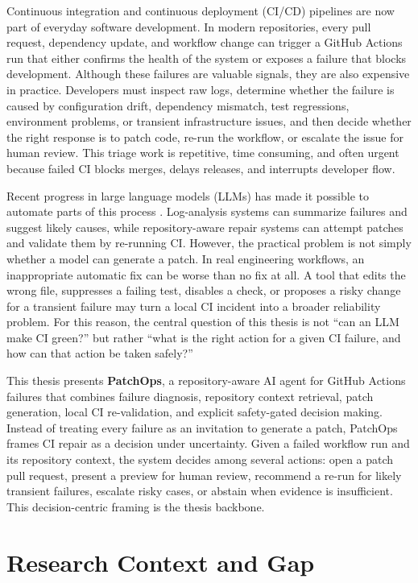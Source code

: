 Continuous integration and continuous deployment (CI/CD) pipelines are now part of everyday software
development. In modern repositories, every pull request, dependency update, and workflow change can trigger a
GitHub Actions run that either confirms the health of the system or exposes a failure that blocks development.
Although these failures are valuable signals, they are also expensive in practice. Developers must inspect raw
logs, determine whether the failure is caused by configuration drift, dependency mismatch, test regressions,
environment problems, or transient infrastructure issues, and then decide whether the right response is to
patch code, re-run the workflow, or escalate the issue for human review. This triage work is repetitive, time
consuming, and often urgent because failed CI blocks merges, delays releases, and interrupts developer flow.

Recent progress in large language models (LLMs) has made it possible to automate parts of this process
\cite{logsage2025,cirepairbench2026}.
Log-analysis systems can summarize failures and suggest likely causes, while repository-aware repair systems can
attempt patches and validate them by re-running CI. However, the practical problem is not simply whether a
model can generate a patch. In real engineering workflows, an inappropriate automatic fix can be worse than no
fix at all. A tool that edits the wrong file, suppresses a failing test, disables a check, or proposes a risky
change for a transient failure may turn a local CI incident into a broader reliability problem. For this
reason, the central question of this thesis is not ``can an LLM make CI green?'' but rather ``what is the right
action for a given CI failure, and how can that action be taken safely?''

This thesis presents \textbf{PatchOps}, a repository-aware AI agent for GitHub Actions failures that combines
failure diagnosis, repository context retrieval, patch generation, local CI re-validation, and explicit
safety-gated decision making. Instead of treating every failure as an invitation to generate a patch, PatchOps
frames CI repair as a decision under uncertainty. Given a failed workflow run and its repository context, the
system decides among several actions: open a patch pull request, present a preview for human review, recommend
a re-run for likely transient failures, escalate risky cases, or abstain when evidence is insufficient. This
decision-centric framing is the thesis backbone.

\section{Research Context and Gap}

